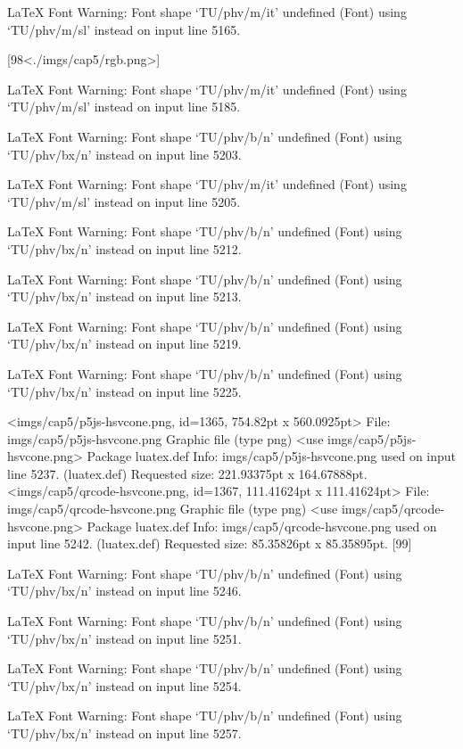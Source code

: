 LaTeX Font Warning: Font shape `TU/phv/m/it' undefined
(Font)              using `TU/phv/m/sl' instead on input line 5165.

[98<./imgs/cap5/rgb.png>]

LaTeX Font Warning: Font shape `TU/phv/m/it' undefined
(Font)              using `TU/phv/m/sl' instead on input line 5185.


LaTeX Font Warning: Font shape `TU/phv/b/n' undefined
(Font)              using `TU/phv/bx/n' instead on input line 5203.


LaTeX Font Warning: Font shape `TU/phv/m/it' undefined
(Font)              using `TU/phv/m/sl' instead on input line 5205.


LaTeX Font Warning: Font shape `TU/phv/b/n' undefined
(Font)              using `TU/phv/bx/n' instead on input line 5212.


LaTeX Font Warning: Font shape `TU/phv/b/n' undefined
(Font)              using `TU/phv/bx/n' instead on input line 5213.


LaTeX Font Warning: Font shape `TU/phv/b/n' undefined
(Font)              using `TU/phv/bx/n' instead on input line 5219.


LaTeX Font Warning: Font shape `TU/phv/b/n' undefined
(Font)              using `TU/phv/bx/n' instead on input line 5225.

<imgs/cap5/p5js-hsvcone.png, id=1365, 754.82pt x 560.0925pt>
File: imgs/cap5/p5js-hsvcone.png Graphic file (type png)
<use imgs/cap5/p5js-hsvcone.png>
Package luatex.def Info: imgs/cap5/p5js-hsvcone.png  used on input line 5237.
(luatex.def)             Requested size: 221.93375pt x 164.67888pt.
<imgs/cap5/qrcode-hsvcone.png, id=1367, 111.41624pt x 111.41624pt>
File: imgs/cap5/qrcode-hsvcone.png Graphic file (type png)
<use imgs/cap5/qrcode-hsvcone.png>
Package luatex.def Info: imgs/cap5/qrcode-hsvcone.png  used on input line 5242.
(luatex.def)             Requested size: 85.35826pt x 85.35895pt.
[99]

LaTeX Font Warning: Font shape `TU/phv/b/n' undefined
(Font)              using `TU/phv/bx/n' instead on input line 5246.


LaTeX Font Warning: Font shape `TU/phv/b/n' undefined
(Font)              using `TU/phv/bx/n' instead on input line 5251.


LaTeX Font Warning: Font shape `TU/phv/b/n' undefined
(Font)              using `TU/phv/bx/n' instead on input line 5254.


LaTeX Font Warning: Font shape `TU/phv/b/n' undefined
(Font)              using `TU/phv/bx/n' instead on input line 5257.


